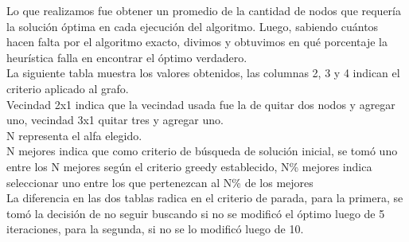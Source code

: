 Lo que realizamos fue obtener un promedio de la cantidad de nodos que requer\'ia la soluci\'on \'optima en cada ejecuci\'on del algoritmo. Luego, sabiendo cu\'antos hacen falta por el algoritmo exacto, divimos y obtuvimos en qu\'e porcentaje la heur\'istica falla en encontrar el \'optimo verdadero.\\

La siguiente tabla muestra los valores obtenidos, las columnas 2, 3 y 4 indican el criterio aplicado al grafo.\\

Vecindad 2x1 indica que la vecindad usada fue la de quitar dos nodos y agregar uno, vecindad 3x1 quitar tres y agregar uno.\\

N representa el alfa elegido.\\

N mejores indica que como criterio de b\'usqueda de soluci\'on inicial, se tom\'o uno entre los N mejores seg\'un el criterio greedy establecido, N\% mejores indica seleccionar uno entre los que pertenezcan al N\% de los mejores\\

La diferencia en las dos tablas radica en el criterio de parada, para la primera, se tom\'o la decisi\'on de no seguir buscando si no se modific\'o el \'optimo luego de 5 iteraciones, para la segunda, si no se lo modific\'o luego de 10.\\

